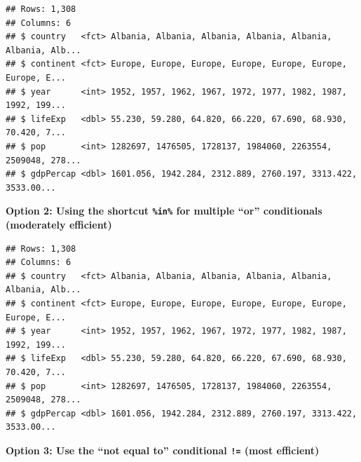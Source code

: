 \documentclass[
]{book}
\newenvironment{Shaded}{\begin{snugshade}}{\end{snugshade}}
\newcommand{\KeywordTok}[1]{\textcolor[rgb]{0.13,0.29,0.53}{\textbf{#1}}}
\newcommand{\NormalTok}[1]{#1}
\newcommand{\OperatorTok}[1]{\textcolor[rgb]{0.81,0.36,0.00}{\textbf{#1}}}
\newcommand{\StringTok}[1]{\textcolor[rgb]{0.31,0.60,0.02}{#1}}
\begin{document}
\begin{verbatim}
## Rows: 1,308
## Columns: 6
## $ country   <fct> Albania, Albania, Albania, Albania, Albania, Albania, Alb...
## $ continent <fct> Europe, Europe, Europe, Europe, Europe, Europe, Europe, E...
## $ year      <int> 1952, 1957, 1962, 1967, 1972, 1977, 1982, 1987, 1992, 199...
## $ lifeExp   <dbl> 55.230, 59.280, 64.820, 66.220, 67.690, 68.930, 70.420, 7...
## $ pop       <int> 1282697, 1476505, 1728137, 1984060, 2263554, 2509048, 278...
## $ gdpPercap <dbl> 1601.056, 1942.284, 2312.889, 2760.197, 3313.422, 3533.00...
\end{verbatim}

\textbf{Option 2: Using the shortcut \texttt{\%in\%} for multiple ``or'' conditionals (moderately efficient)}

\begin{Shaded}
\end{Shaded}

\begin{verbatim}
## Rows: 1,308
## Columns: 6
## $ country   <fct> Albania, Albania, Albania, Albania, Albania, Albania, Alb...
## $ continent <fct> Europe, Europe, Europe, Europe, Europe, Europe, Europe, E...
## $ year      <int> 1952, 1957, 1962, 1967, 1972, 1977, 1982, 1987, 1992, 199...
## $ lifeExp   <dbl> 55.230, 59.280, 64.820, 66.220, 67.690, 68.930, 70.420, 7...
## $ pop       <int> 1282697, 1476505, 1728137, 1984060, 2263554, 2509048, 278...
## $ gdpPercap <dbl> 1601.056, 1942.284, 2312.889, 2760.197, 3313.422, 3533.00...
\end{verbatim}

\textbf{Option 3: Use the ``not equal to'' conditional \texttt{!=} (most efficient)}

\begin{Shaded}
\end{Shaded}
\end{document}
